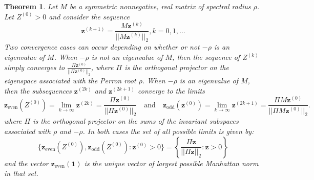 \documentclass[a4paper,11pt]{report}
\newtheorem{theorem}{Theorem}[section]
\begin{document}
 \begin{theorem}\label{grootbewijs}
   Let $M$ be a  symmetric nonnegative, real matrix of spectral radius $\rho$. Let $Z^{(0)} > 0$ 
   and consider the sequence
   $$\mathbf{z}^{(k+1)} = \frac{M\mathbf{z}^{(k)}}{||M\mathbf{z}^{(k)}||_2}, k = 0,1,\ldots$$
   Two convergence cases can occur depending on whether or not $-\rho$ is an 
   eigenvalue of $M$. When $-\rho$ is not an eigenvalue of $M$, then the 
   sequence of $Z^{(k)}$ simply converges to 
   $\frac{\Pi \mathbf{z}^{(0)}}{||\Pi \mathbf{z}^{(0)}||_2}$, where $\Pi$ is the orthogonal projector on the 
  eigenspace associated with the Perron root $\rho$. When $-\rho$ is an 
   eigenvalue of $M$, then the subsequences $\mathbf{z}^{(2k)}$ and $\mathbf{z}^{(2k+1)}$ converge to 
   the limits
   $$\mathbf{z}_{\text{even}}(Z^{(0)}) = \lim_{k \to \infty} \mathbf{z}^{(2k)}  = \frac{\Pi \mathbf{z}^{(0)}}{||\Pi \mathbf{z}^{(0)}||_2} \quad \text{and}\quad \mathbf{z}_{\text{odd}}(\mathbf{z}^{(0)}) = \lim_{k \to \infty} \mathbf{z}^{(2k+1)} = \frac{\Pi M \mathbf{z}^{(0)}}{||\Pi M \mathbf{z}^{(0)}||_2}.$$
where $\Pi$ is the orthogonal projector on the sums of the invariant subspaces associated with $\rho$
and $-\rho$. In both cases the set of all possible limits is given by:
$$\{\mathbf{z}_{\text{even}}(Z^{(0)}), \mathbf{z}_{\text{odd}}(Z^{(0)}): \mathbf{z}^{(0)} > 0\} = \left\{ \frac{\Pi \mathbf{z}}{||\Pi \mathbf{z}||_2}: \mathbf{z} > 0 \right\}$$
and the vector $\mathbf{z}_{\text{even}}(\mathbf{1})$ is the unique vector of largest 
possible Manhattan norm in that set. \end{theorem}
\end{document}
